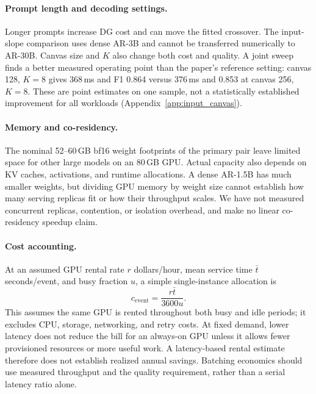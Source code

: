 \paragraph{Prompt length and decoding settings.}
Longer prompts increase DG cost and can move the fitted crossover.
The input-slope comparison uses dense AR-3B and cannot be transferred
numerically to AR-30B. Canvas size and $K$ also change both cost and
quality. A joint sweep finds a better measured operating point than the
paper's reference setting: canvas 128, $K{=}8$ gives 368\,ms and
F1 0.864 versus 376\,ms and 0.853 at canvas 256, $K{=}8$.
These are point estimates on one sample, not a statistically established
improvement for all workloads (Appendix~\ref{app:input_canvas}).

\paragraph{Memory and co-residency.}
The nominal 52--60\,GB bf16 weight footprints of the primary pair
leave limited space for other large models on an 80\,GB GPU. Actual
capacity also depends on KV caches, activations, and runtime allocations.
A dense AR-1.5B has much smaller weights, but dividing GPU memory by
weight size cannot establish how many serving replicas fit or how their
throughput scales. We have not measured concurrent replicas, contention,
or isolation overhead, and make no linear co-residency speedup claim.

\paragraph{Cost accounting.}
At an assumed GPU rental rate $r$ dollars/hour, mean service time
$\bar t$ seconds/event, and busy fraction $u$, a simple single-instance
allocation is
\begin{equation}
 c_{\mathrm{event}}=\frac{r\bar t}{3600u}.
\end{equation}
This assumes the same GPU is rented throughout both busy and idle periods;
it excludes CPU, storage, networking, and retry costs. At fixed demand,
lower latency does not reduce the bill for an always-on GPU unless it
allows fewer provisioned resources or more useful work. A latency-based rental estimate therefore does not establish realized
annual savings. Batching economics should use measured throughput and
the quality requirement, rather than a serial latency ratio alone.
